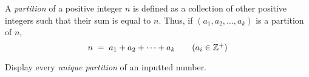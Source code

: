 

\problem A {\em partition} of a positive integer $n$ is defined as a collection of other positive integers such that
their sum is equal to $n$. Thus, if $(a_1, a_2, \dots, a_k)$ is a partition of $n$,
\begin{equation*}
	n	\;=\;	a_1 + a_2 + \dots + a_k 			\tag{$a_i \in \mathbb{Z}^{+}$}
\end{equation*}

Display every {\em unique partition} of an inputted number.

\solution

\sourcecode
